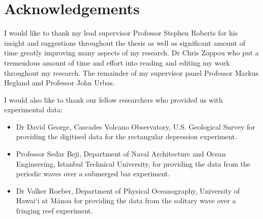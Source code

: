 
\chapter*{Acknowledgements}\label{acknowledgements}




I would like to thank my lead supervisor Professor Stephen Roberts for his insight and suggestions throughout the thesis as well as significant amount of time greatly improving many aspects of my research. Dr Chris Zoppou who put a tremendous amount of time and effort into reading and editing my work throughout my research. The remainder of my supervisor panel Professor Markus Hegland and Professor John Urbas.


I would also like to thank our fellow researchers who provided us with experimental data:
\begin{itemize}
	\item Dr David George, Cascades Volcano Observatory, U.S. Geological Survey for providing the digitised data for the rectangular depression experiment.
	\item Professor Sedar Beji, Department of Naval Architecture and Ocean Engineering, Istanbul Technical University, for providing the data from the periodic waves over a submerged bar experiment.
	\item Dr Volker Roeber, Department of Physical Oceanography, University of Hawai`i at M\={a}noa for providing the data from the solitary wave over a fringing reef experiment.  
\end{itemize}
